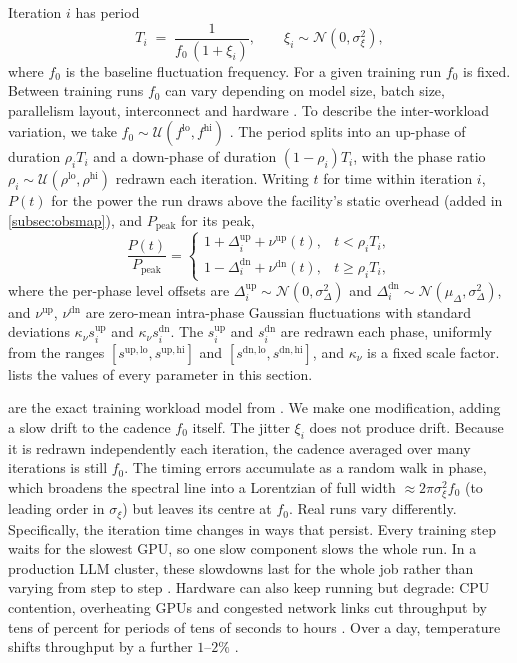 \documentclass{article}
\begin{document}
Iteration $i$ has period
\begin{equation}
	T_i \;=\; \frac{1}{f_0\,(1+\xi_i)}, \qquad \xi_i \sim \mathcal{N}(0,\sigma_\xi^2),
	\label{eq:period}
\end{equation}
where $f_0$ is the baseline fluctuation frequency. For a given training run $f_0$ is fixed. Between training runs $f_0$ can vary depending on model size, batch size, parallelism layout, interconnect and hardware \citep{patel2024characterizing,jain2024pal}. To describe the inter-workload variation, we take  $f_0 \sim \mathcal{U}(f^{\mathrm{lo}}, f^{\mathrm{hi}})$ . The period splits into an up-phase of duration
$\rho_i T_i$ and a down-phase of duration $(1-\rho_i) T_i$, with the phase ratio
$\rho_i \sim \mathcal{U}(\rho^{\mathrm{lo}}, \rho^{\mathrm{hi}})$ redrawn each iteration. Writing $t$ for time
within iteration $i$, $P(t)$ for the power the run draws above the facility's static
overhead (added in \cref{subsec:obsmap}), and $P_{\mathrm{peak}}$ for its peak,
\begin{equation}
	\frac{P(t)}{P_{\mathrm{peak}}} =
	\begin{cases}
		1 + \Delta^{\mathrm{up}}_i + \nu^{\mathrm{up}}(t), & t < \rho_i T_i,\\[2pt]
		1 - \Delta^{\mathrm{dn}}_i + \nu^{\mathrm{dn}}(t), & t \geq \rho_i T_i,
	\end{cases}
	\label{eq:ko}
\end{equation}
where the per-phase level offsets are
$\Delta^{\mathrm{up}}_i \sim \mathcal{N}(0, \sigma_\Delta^2)$ and
$\Delta^{\mathrm{dn}}_i \sim \mathcal{N}(\mu_\Delta, \sigma_\Delta^2)$, and
$\nu^{\mathrm{up}}$, $\nu^{\mathrm{dn}}$ are zero-mean intra-phase Gaussian
fluctuations with standard deviations $\kappa_\nu s^{\mathrm{up}}_i$ and
$\kappa_\nu s^{\mathrm{dn}}_i$. The $s^{\mathrm{up}}_i$ and $s^{\mathrm{dn}}_i$
are redrawn each phase, uniformly from the ranges
$[s^{\mathrm{up,lo}}, s^{\mathrm{up,hi}}]$ and
$[s^{\mathrm{dn,lo}}, s^{\mathrm{dn,hi}}]$, and $\kappa_\nu$ is a fixed
scale factor.  lists the values
of every parameter in this section.

 are the exact training workload model from \citet{ko2025widearea}. We make one modification, adding a slow drift to the cadence $f_0$ itself. The jitter $\xi_i$ does not produce drift. Because it is redrawn independently
each iteration, the cadence averaged over many iterations is still $f_0$. The
timing errors accumulate as a random walk in phase, which broadens the spectral
line into a Lorentzian of full width $\approx 2\pi\sigma_\xi^2 f_0$ (to leading
order in $\sigma_\xi$) but leaves its centre at $f_0$. Real runs vary differently. Specifically, the iteration time changes in ways that persist.
Every training step waits for the slowest GPU, so one slow component slows the
whole run. In a production LLM cluster, these slowdowns last for the whole job
rather than varying from step to step \citep{lin2025stragglers}. Hardware can
also keep running but degrade: CPU contention, overheating GPUs and congested
network links cut throughput by tens of percent for periods of tens of seconds
to hours \citep{wu2024falcon}. Over a day,
temperature shifts throughput by a further $1$--$2\%$
\citep{grattafiori2024llama3}. 
\end{document}
